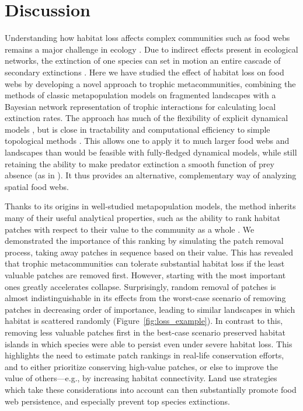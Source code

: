 \documentclass[11pt]{article}
\begin{document}
\section{Discussion} \label{sec:discussion}

Understanding how habitat loss affects complex communities such as food webs remains a major challenge in ecology \citep{Guzman2018, LeiboldChase2018}. Due to indirect effects present in ecological networks, the extinction of one species can set in motion an entire cascade of secondary extinctions \citep{EbenmanJonsson2005, Dunne2009}. Here we have studied the effect of habitat loss on food webs by developing a novel approach to trophic metacommunities, combining the methods of classic metapopulation models on fragmented landscapes \citep{HanskiOvaskainen2000, HanskiOvaskainen2003, OvaskainenHanski2001, Grillietal2015} with a Bayesian network representation of trophic interactions \citep{Eklofetal2013MEE} for calculating local extinction rates. The approach has much of the flexibility of explicit dynamical models \citep{Ryser2019}, but is close in tractability and computational efficiency to simple topological methods \citep{Dunne2009}. This allows one to apply it to much larger food webs and landscapes than would be feasible with fully-fledged dynamical models, while still retaining the ability to make predator extinction a smooth function of prey absence (as in \citealp{Cazellesetal2015}). It thus provides an alternative, complementary way of analyzing spatial food webs.

Thanks to its origins in well-studied metapopulation models, the method inherits many of their useful analytical properties, such as the ability to rank habitat patches with respect to their value to the community as a whole \citep{OvaskainenHanski2001}. We demonstrated the importance of this ranking by simulating the patch removal process, taking away patches in sequence based on their value. This has revealed that trophic metacommunities can tolerate substantial habitat loss if the least valuable patches are removed first. However, starting with the most important ones greatly accelerates collapse. Surprisingly, random removal of patches is almost indistinguishable in its effects from the worst-case scenario of removing patches in decreasing order of importance, leading to similar landscapes in which habitat is scattered randomly (Figure~\ref{fig:loss_example}). In contrast to this, removing less valuable patches first in the best-case scenario preserved habitat islands in which species were able to persist even under severe habitat loss. This highlights the need to estimate patch rankings in real-life conservation efforts, and to either prioritize conserving high-value patches, or else to improve the value of others---e.g., by increasing habitat connectivity. Land use strategies which take these considerations into account can then substantially promote food web persistence, and especially prevent top species extinctions.
\end{document}

